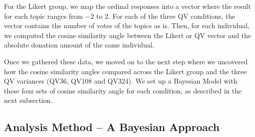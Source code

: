 For the Likert group, we map the ordinal responses into a vector where the result for each topic ranges from $-2$ to $2$. For each of the three QV conditions, the vector contains the number of votes of the topics as is. Then, for each individual, we computed the cosine similarity angle between the Likert or QV vector and the absolute donation amount of the same individual. 

Once we gathered these data, we moved on to the next step where we uncovered how the cosine similarity angles compared across the Likert group and the three QV variances (QV36, QV108 and QV324). We set up a Bayesian Model with these four sets of cosine similarity angle for each condition, as described in the next subsection.

\subsection{Analysis Method -- A Bayesian Approach}
\label{exp1:The Bayesian Model}



